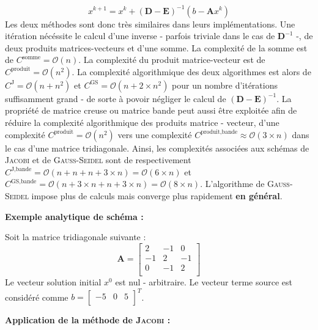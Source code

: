 \documentclass[12pt]{report}
\newcommand{\A}{\mathbf{A}}
\newcommand{\E}{\mathbf{E}}
\newcommand{\D}{\mathbf{D}}
\begin{document}
\begin{equation}
x^{k+1} = x^k + \left( \D - \E \right)^{-1} \left( b - \A x^k  \right)
\end{equation}
Les deux méthodes sont donc très similaires dans leurs implémentations. Une itération nécéssite le calcul d'une inverse - parfois triviale dans le cas de $\D^{-1}$ -, de deux produits matrices-vecteurs et d'une somme. La complexité de la somme est de $C^{\text{somme}} = \mathcal{O}(n)$. La complexité du produit matrice-vecteur est de $C^{\text{produit}} = \mathcal{O}(n^2)$.  La complexité algorithmique des deux algorithmes est alors de $C^{\text{J}} = \mathcal{O}(n + n^2)$ et $C^{\text{GS}} = \mathcal{O}(n + 2 \times n^2)$ pour un nombre d'itérations suffisamment grand - de sorte à povoir négliger le calcul de $\left( \D - \E \right)^{-1}$. La propriété de matrice creuse ou matrice bande peut aussi être exploitée afin de réduire la complexité algorithmique des produits matrice - vecteur, d'une complexité $C^{\text{produit}} = \mathcal{O}(n^2)$ vers une complexité $C^{\text{produit,bande}} \approx \mathcal{O}(3 \times n)$ dans le cas d'une matrice tridiagonale. Ainsi, les complexités associées aux schémas de \textsc{Jacobi} et de \textsc{Gauss-Seidel} sont de respectivement  $C^{\text{J,bande}} = \mathcal{O}(n + n + n + 3\times n) =\mathcal{O}(6\times n) $ et $C^{\text{GS,bande}} = \mathcal{O}(n + 3 \times n + n + 3\times n) =\mathcal{O}(8\times n) $. L'algorithme de \textsc{Gauss-Seidel}  impose plus de calculs mais converge plus rapidement \textbf{en général}.

\textbf{Exemple analytique de schéma :}

Soit la matrice tridiagonale suivante :
\begin{equation}
\A = \begin{bmatrix}
2 & -1 & 0  \\
-1 & 2 & -1  \\ 
0 & -1 & 2  \\ 
\end{bmatrix}
\end{equation}
Le vecteur solution initial $x^0$ est nul - arbitraire. Le vecteur terme source est considéré comme $b = \begin{bmatrix}
-5 & 0 & 5 \\
\end{bmatrix}^T$.

\textbf{Application de la méthode de \textsc{Jacobi} :}
\end{document}
